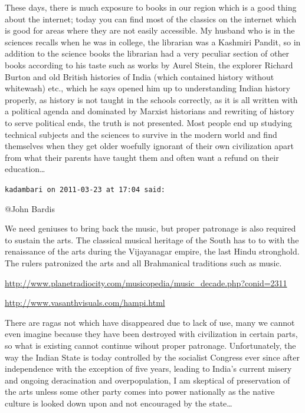 \begin{footnotesize}
\begin{sffamily}
These days, there is much exposure to books in our region which is a good thing about the internet; today you can find most of the classics on the internet which is good for areas where they are not easily accessible. My husband who is in the sciences recalls when he was in college, the librarian was a Kashmiri Pandit, so in addition to the science books the librarian had a very peculiar section of other books according to his taste such as works by Aurel Stein, the explorer Richard Burton and old British histories of India (which contained history without whitewash) etc., which he says opened him up to understanding Indian history properly, as history is not taught in the schools correctly, as it is all written with a political agenda and dominated by Marxist historians and rewriting of history to serve political ends, the truth is not presented. Most people end up studying technical subjects and the sciences to survive in the modern world and find themselves when they get older woefully ignorant of their own civilization apart from what their parents have taught them and often want a refund on their education…


\hfill

\texttt{kadambari on 2011-03-23 at 17:04 said: }

@John Bardis

We need geniuses to bring back the music, but proper patronage is also required to sustain the arts. The classical musical heritage of the South has to to with the renaissance of the arts during the Vijayanagar empire, the last Hindu stronghold. The rulers patronized the arts and all Brahmanical traditions such as music.

\url{http://www.planetradiocity.com/musicopedia/music\_decade.php?conid=2311}

\url{http://www.vasanthvisuals.com/hampi.html}

There are ragas not which have disappeared due to lack of use, many we cannot even imagine because they have been destroyed with civilization in certain parts, so what is existing cannot continue wihout proper patronage. Unfortunately, the way the Indian State is today controlled by the socialist Congress ever since after independence with the exception of five years, leading to India's current misery and ongoing deracination and overpopulation, I am skeptical of preservation of the arts unless some other party comes into power nationally as the native culture is looked down upon and not encouraged by the state…


\hfill


\end{sffamily}
\end{footnotesize}
